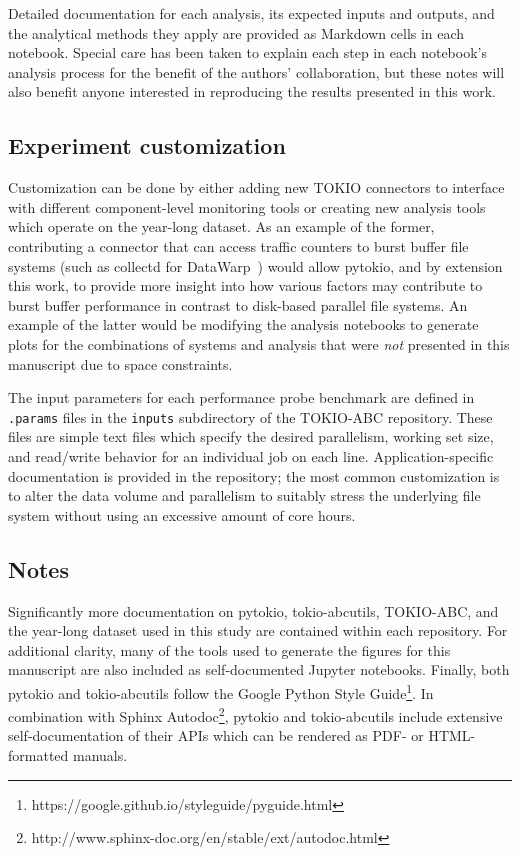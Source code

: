 Detailed documentation for each analysis, its expected inputs and outputs, and the analytical methods they apply are provided as Markdown cells in each notebook.
Special care has been taken to explain each step in each notebook's analysis process for the benefit of the authors' collaboration, but these notes will also benefit anyone interested in reproducing the results presented in this work.

\subsection{Experiment customization}

Customization can be done by either adding new TOKIO connectors to interface with different component-level monitoring tools or creating new analysis tools which operate on the year-long dataset.
As an example of the former, contributing a connector that can access traffic counters to burst buffer file systems (such as collectd for DataWarp~\cite{Lockwood2018tokio}) would allow pytokio, and by extension this work, to provide more insight into how various factors may contribute to burst buffer performance in contrast to disk-based parallel file systems.
An example of the latter would be modifying the analysis notebooks to generate plots for the combinations of systems and analysis that were \emph{not} presented in this manuscript due to space constraints.

The input parameters for each performance probe benchmark are defined in \texttt{.params} files in the \texttt{inputs} subdirectory of the TOKIO-ABC repository.
These files are simple text files which specify the desired parallelism, working set size, and read/write behavior for an individual job on each line.
Application-specific documentation is provided in the repository; the most common customization is to alter the data volume and parallelism to suitably stress the underlying file system without using an excessive amount of core hours.

\subsection{Notes}

Significantly more documentation on pytokio, tokio-abcutils, TOKIO-ABC, and the year-long dataset used in this study are contained within each repository.
For additional clarity, many of the tools used to generate the figures for this manuscript are also included as self-documented Jupyter notebooks.
Finally, both pytokio and tokio-abcutils follow the Google Python Style Guide\footnote{https://google.github.io/styleguide/pyguide.html}.
In combination with Sphinx Autodoc\footnote{http://www.sphinx-doc.org/en/stable/ext/autodoc.html}, pytokio and tokio-abcutils include extensive self-documentation of their APIs which can be rendered as PDF- or HTML-formatted manuals.
